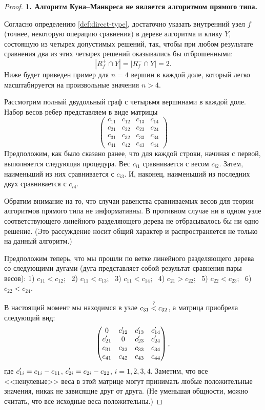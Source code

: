 \begin{proof}
	\textbf{1. Алгоритм Куна--Манкреса не является алгоритмом прямого типа.}
	
	Согласно определению \ref{def:direct-type}, достаточно указать
	внутренний узел $f$ (точнее, некоторую операцию сравнения) 
	в дереве алгоритма и клику $Y$, состоящую из четырех допустимых решений,
	так, чтобы при любом результате сравнения два из этих четырех решений
	оказывались бы отброшенными:
	\[
	|R_f^+ \cap Y| = |R_f^- \cap Y| = 2.
	\]
	Ниже будет приведен пример для $n = 4$ вершин в каждой доле, 
	который легко масштабируется на произвольные значения $n > 4$.
	
	Рассмотрим полный двудольный граф с четырьмя вершинами в каждой доле.
	Набор весов ребер представляем в виде матрицы
	\[
	\begin{pmatrix}
	c_{11} & c_{12} & c_{13} & c_{14} \\
	c_{21} & c_{22} & c_{23} & c_{24} \\
	c_{31} & c_{32} & c_{33} & c_{34} \\
	c_{41} & c_{42} & c_{43} & c_{44} 
	\end{pmatrix}
	\]
	Предположим, как было сказано ранее, что для каждой строки, начиная с первой,
	выполняется следующая процедура.
	Вес $c_{i1}$ сравнивается с весом $c_{i2}$.
	Затем, наименьший из них сравнивается с $c_{i3}$.
	И, наконец, наименьший из последних двух сравнивается с $c_{i4}$.
	
	Обратим внимание на то, 
	что случаи равенства сравниваемых весов для теории алгоритмов прямого типа не информативны. 
	В противном случае ни в одном узле соответствующего линейного разделяющего 
	дерева не отбрасывалось бы ни одно решение. 
	(Это рассуждение носит общий характер и распространяется не только на данный алгоритм.) 
	
	Предположим теперь, что мы прошли по ветке линейного разделяющего дерева со следующими дугами
	(дуга представляет собой результат сравнения пары весов):
	1) $c_{11} < c_{12}$; \ 
	2) $c_{11} < c_{13}$; \ 
	3) $c_{11} < c_{14}$; \ 
	4) $c_{21} > c_{22}$; \ 
	5) $c_{22} < c_{23}$; \ 
	6) $c_{22} < c_{24}$.
	
	В настоящий момент мы находимся в узле $c_{31} \stackrel{?}{<} c_{32}$,
	а матрица приобрела следующий вид:
	\[
	\begin{pmatrix}
	0  & \cs_{12} & \cs_{13} & \cs_{14} \\
	\cs_{21} &     0  & \cs_{23} & \cs_{24} \\
	c_{31} & c_{32} & c_{33} & c_{34} \\
	c_{41} & c_{42} & c_{43} & c_{44} 
	\end{pmatrix},
	\]
	где $\cs_{1i} = c_{1i} - c_{11}$, $\cs_{2i} = c_{2i} - c_{22}$, $i = 1,2,3,4$.
	Заметим, что все <<ненулевые>> веса в этой матрице могут принимать любые
	положительные значения, никак не зависящие друг от друга.
	(Не уменьшая общности, можно считать, что все исходные веса положительны.) 
	

\end{proof}
